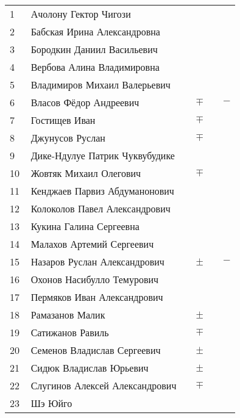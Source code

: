 \documentclass[a4paper,11pt]{article}
\newcommand*\ok{&{\small \ding{51}}} %
\newcommand*\no{&{\small }} %
\newcommand*\PM{&$\pm$}
\newcommand*\MP{&$\mp$}
\newcommand*\MM{&$-$}
\begin{document}
\begin{tabular}{p{7pt}|l|p{6pt}p{6pt}p{6pt}p{6pt}}
\\
\midrule
		1\,&Ачолону Гектор Чигози\no\no\no\\
		2\,&Бабская Ирина Александровна\ok\ok\ok\ok\\
		3\,&Бородкин Даниил Васильевич\ok\ok\ok\ok\\
		4\,&Вербова Алина Владимировна\no\no\ok\ok\\
		5\,&Владимиров Михаил Валерьевич\ok\ok\ok\ok\\
		6\,&Власов Фёдор Андреевич\ok\MP\ok\MM\\
		7\,&Гостищев Иван\ok\MP\ok\ok\\
		8\,&Джунусов Руслан\ok\MP\no\\
		9\,&Дике-Ндулуе Патрик Чуквубудике\ok\no\ok\ok\\
		10\,&Жовтяк Михаил Олегович\no\MP\ok\ok\\
		11\,&Кенджаев Парвиз Абдуманонович\ok\no\no\\
		12\,&Колоколов Павел Александрович\no\no\ok\ok\\
		13\,&Кукина Галина Сергеевна\ok\no\ok\ok\\
		14\,&Малахов Артемий Сергеевич\ok\ok\ok\ok\\
		15\,&Назаров Руслан Александрович\ok\PM\ok\MM\\
		16\,&Охонов Насибулло Темурович\ok\no\ok\ok\\
		17\,&Пермяков Иван Александрович\ok\ok\ok\ok\\
		18\,&Рамазанов Малик\ok\PM\ok\ok\\
		19\,&Сатижанов Равиль\ok\MP\ok\ok\\
		20\,&Семенов Владислав Сергеевич\ok\PM\ok\ok\\
		21\,&Сидюк Владислав Юрьевич\ok\PM\ok\ok\\
		22\,&Слугинов Алексей Александрович\ok\MP\ok\ok\\
		23\,&Шэ Юйго\ok\no\ok\\
\bottomrule
\end{tabular} 

\newpage
\end{document}
